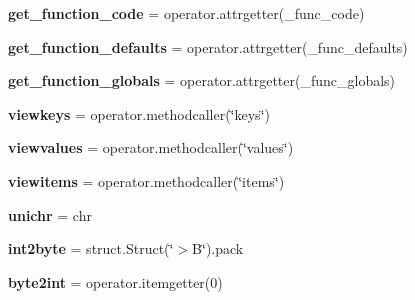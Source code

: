 \begin{DoxyCompactItemize}
\mbox{\label{namespacesetuptools_1_1__vendor_1_1six_a1000984fc032b94aad19181d41918c80}} 
{\bfseries get\+\_\+function\+\_\+code} = operator.\+attrgetter(\+\_\+func\+\_\+code)
\item 
\mbox{\label{namespacesetuptools_1_1__vendor_1_1six_afcc46288b6ac6ed8c141c809bbd0d6a1}} 
{\bfseries get\+\_\+function\+\_\+defaults} = operator.\+attrgetter(\+\_\+func\+\_\+defaults)
\item 
\mbox{\label{namespacesetuptools_1_1__vendor_1_1six_a16d582fb69234f25e9ae563e4afb3d76}} 
{\bfseries get\+\_\+function\+\_\+globals} = operator.\+attrgetter(\+\_\+func\+\_\+globals)
\item 
\mbox{\label{namespacesetuptools_1_1__vendor_1_1six_ab7bbeed86c5d5718eb91b54ddc0866f6}} 
{\bfseries viewkeys} = operator.\+methodcaller(\char`\"{}keys\char`\"{})
\item 
\mbox{\label{namespacesetuptools_1_1__vendor_1_1six_a9c50d2d84005a4b56c80c5485c0fd79f}} 
{\bfseries viewvalues} = operator.\+methodcaller(\char`\"{}values\char`\"{})
\item 
\mbox{\label{namespacesetuptools_1_1__vendor_1_1six_a97421d76b2f6961bfcce47a88b5dccb2}} 
{\bfseries viewitems} = operator.\+methodcaller(\char`\"{}items\char`\"{})
\item 
\mbox{\label{namespacesetuptools_1_1__vendor_1_1six_a9547d80560a55b40aa88c396d1f905b4}} 
{\bfseries unichr} = chr
\item 
\mbox{\label{namespacesetuptools_1_1__vendor_1_1six_a05e11bf8dc06399dd022312f097cbb14}} 
{\bfseries int2byte} = struct.\+Struct(\char`\"{}$>$B\char`\"{}).pack
\item 
\mbox{\label{namespacesetuptools_1_1__vendor_1_1six_a35743957b694d8809b5351c72c5b90a8}} 
{\bfseries byte2int} = operator.\+itemgetter(0)
\item 

\end{DoxyCompactItemize}
